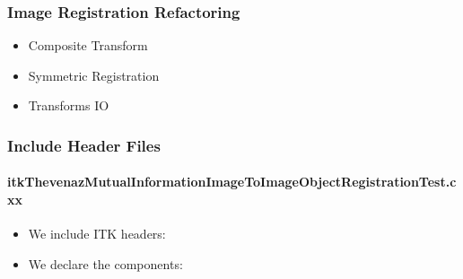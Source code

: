
\begin{frame}
\frametitle{Image Registration Refactoring}
\Huge
\begin{itemize}
\item Composite Transform
\pause
\item Symmetric Registration
\pause
\item Transforms IO
\end{itemize}
\end{frame}



\begin{frame}
\frametitle{Include Header Files}
\framesubtitle{itkThevenazMutualInformationImageToImageObjectRegistrationTest.cxx}
\begin{itemize}
\item We include ITK headers:
\item We declare the components:
\end{itemize}
\end{frame}



